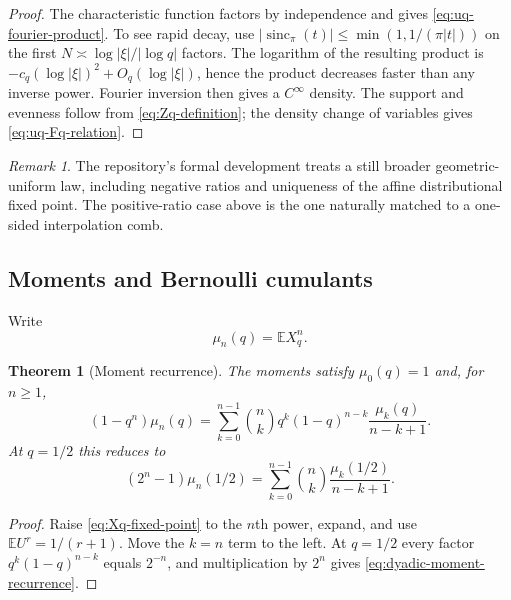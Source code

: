 \documentclass[11pt,a4paper,oneside]{article}
\newtheorem{theorem}{Theorem}[section]
\theoremstyle{definition}
\theoremstyle{remark}
\newtheorem{remark}[remark]{Remark}
\newcommand{\E}{\mathbb E}
\newcommand{\sincpi}{\operatorname{sinc}_{\pi}}
\begin{document}
\begin{proof}
The characteristic function factors by independence and gives
\eqref{eq:uq-fourier-product}.  To see rapid decay, use
$|\sincpi(t)|\le\min(1,1/(\pi|t|))$ on the first
$N\asymp\log|\xi|/|\log q|$ factors.  The logarithm of the resulting product
is $-c_q(\log|\xi|)^2+O_q(\log|\xi|)$, hence the product decreases faster than
any inverse power.  Fourier inversion then gives a $C^\infty$ density.  The
support and evenness follow from \eqref{eq:Zq-definition}; the density change
of variables gives \eqref{eq:uq-Fq-relation}.
\end{proof}

\begin{remark}
The repository's formal development treats a still broader geometric-uniform
law, including negative ratios and uniqueness of the affine distributional
fixed point.  The positive-ratio case above is the one naturally matched to a
one-sided interpolation comb.
\end{remark}

\subsection{Moments and Bernoulli cumulants}

Write
\begin{equation}
 \mu_n(q)=\E X_q^n.
 \label{eq:muq-definition}
\end{equation}

\begin{theorem}[Moment recurrence]
\label{thm:moment-recurrence}
The moments satisfy $\mu_0(q)=1$ and, for $n\ge1$,
\begin{equation}
 (1-q^n)\mu_n(q)
 =\sum_{k=0}^{n-1}\binom nk
 q^k(1-q)^{n-k}\frac{\mu_k(q)}{n-k+1}.
 \label{eq:general-moment-recurrence}
\end{equation}
At $q=1/2$ this reduces to
\begin{equation}
 (2^n-1)\mu_n(1/2)
 =\sum_{k=0}^{n-1}\binom nk\frac{\mu_k(1/2)}{n-k+1}.
 \label{eq:dyadic-moment-recurrence}
\end{equation}
\end{theorem}

\begin{proof}
Raise \eqref{eq:Xq-fixed-point} to the $n$th power, expand, and use
$\E U^r=1/(r+1)$.  Move the $k=n$ term to the left.  At $q=1/2$ every factor
$q^k(1-q)^{n-k}$ equals $2^{-n}$, and multiplication by $2^n$ gives
\eqref{eq:dyadic-moment-recurrence}.
\end{proof}
\end{document}
